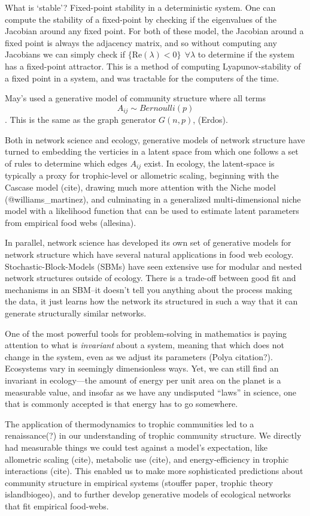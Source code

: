 What is `stable'? Fixed-point stability in a deterministic system. One
can compute the stability of a fixed-point by checking if the
eigenvalues of the Jacobian around any fixed point. For both of these
model, the Jacobian around a fixed point is always the adjacency matrix,
and so without computing any Jacobians we can simply check if
\(\{ \text{Re}(\lambda) < 0 \} \ \ \forall\lambda\) to determine if the
system has a fixed-point attractor. This is a method of computing
Lyapunov-stability of a fixed point in a system, and was tractable for
the computers of the time.

May's used a generative model of community structure where all terms
\[A_{ij} \sim Bernoulli(p)\]. This is the same as the graph generator
\(G(n,p)\), (Erdos).

Both in network science and ecology, generative models of network
structure have turned to embedding the verticies in a latent space from
which one follows a set of rules to determine which edges \(A_{ij}\)
exist. In ecology, the latent-space is typically a proxy for
trophic-level or allometric scaling, beginning with the Cascase model
(cite), drawing much more attention with the Niche model
(@williams\_martinez), and culminating in a generalized
multi-dimensional niche model with a likelihood function that can be
used to estimate latent parameters from empirical food webs (allesina).

In parallel, network science has developed its own set of generative
models for network structure which have several natural applications in
food web ecology. Stochastic-Block-Models (SBMs) have seen extensive use
for modular and nested network structures outside of ecology. There is a
trade-off between good fit and mechanisms in an SBM--it doesn't tell you
anything about the process making the data, it just learns how the
network its structured in such a way that it can generate structurally
similar networks.

One of the most powerful tools for problem-solving in mathematics is
paying attention to what is \emph{invariant} about a system, meaning
that which does not change in the system, even as we adjust its
parameters (Polya citation?). Ecosystems vary in seemingly dimensionless
ways. Yet, we can still find an invariant in ecology---the amount of
energy per unit area on the planet is a measurable value, and insofar as
we have any undisputed ``laws'' in science, one that is commonly
accepted is that energy has to go somewhere.

The application of thermodynamics to trophic communities led to a
renaissance(?) in our understanding of trophic community structure. We
directly had measurable things we could test against a model's
expectation, like allometric scaling (cite), metabolic use (cite), and
energy-efficiency in trophic interactions (cite). This enabled us to
make more sophisticated predictions about community structure in
empirical systems (stouffer paper, trophic theory islandbiogeo), and to
further develop generative models of ecological networks that fit
empirical food-webs.

